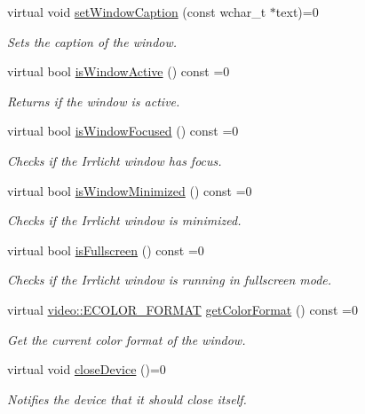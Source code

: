 \begin{DoxyCompactItemize}
virtual void \hyperlink{classirr_1_1IrrlichtDevice_a3d7c98d520bf18ce1973c6f1439a7c0f}{set\+Window\+Caption} (const wchar\+\_\+t $\ast$text)=0
\begin{DoxyCompactList}\small\item\em Sets the caption of the window. \end{DoxyCompactList}\item 
virtual bool \hyperlink{classirr_1_1IrrlichtDevice_abd3c88336b739da2694883d5ffd25a70}{is\+Window\+Active} () const =0
\begin{DoxyCompactList}\small\item\em Returns if the window is active. \end{DoxyCompactList}\item 
virtual bool \hyperlink{classirr_1_1IrrlichtDevice_a960069dc52b4f1303d18945dcbad7f3a}{is\+Window\+Focused} () const =0
\begin{DoxyCompactList}\small\item\em Checks if the Irrlicht window has focus. \end{DoxyCompactList}\item 
virtual bool \hyperlink{classirr_1_1IrrlichtDevice_a69e96b9c49c65391e406377a92e795b1}{is\+Window\+Minimized} () const =0
\begin{DoxyCompactList}\small\item\em Checks if the Irrlicht window is minimized. \end{DoxyCompactList}\item 
virtual bool \hyperlink{classirr_1_1IrrlichtDevice_a409df5e9b9b90635bd3c2db31978a5c1}{is\+Fullscreen} () const =0
\begin{DoxyCompactList}\small\item\em Checks if the Irrlicht window is running in fullscreen mode. \end{DoxyCompactList}\item 
virtual \hyperlink{namespaceirr_1_1video_a1d5e487888c32b1674a8f75116d829ed}{video\+::\+E\+C\+O\+L\+O\+R\+\_\+\+F\+O\+R\+M\+AT} \hyperlink{classirr_1_1IrrlichtDevice_a9dccd3d7af7cfbabee46214a89bd6650}{get\+Color\+Format} () const =0
\begin{DoxyCompactList}\small\item\em Get the current color format of the window. \end{DoxyCompactList}\item 
virtual void \hyperlink{classirr_1_1IrrlichtDevice_a08c97937e0f60f98d443b397a7c60e18}{close\+Device} ()=0
\begin{DoxyCompactList}\small\item\em Notifies the device that it should close itself. \end{DoxyCompactList}\item 

\end{DoxyCompactItemize}
